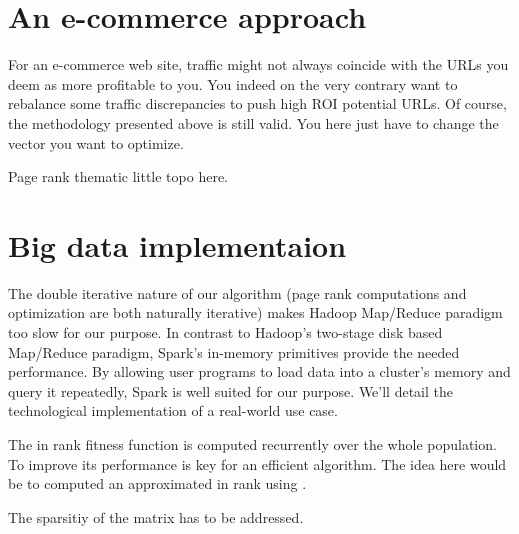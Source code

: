 \documentclass{iSWAGArticle}
\begin{document}
\section{An e-commerce approach}
For an e-commerce web site, traffic might not always coincide with the URLs you deem as more profitable to you.
You indeed on the very contrary want to rebalance some traffic discrepancies to push high ROI potential URLs.
Of course, the methodology presented above is still valid. You here just have to change the vector you want to
optimize.


Page rank thematic little topo here.

\section{Big data implementaion}
The double iterative nature of our algorithm (page rank computations and optimization are both naturally iterative)
makes Hadoop Map/Reduce paradigm too slow for our purpose. 
In contrast to Hadoop's two-stage disk based Map/Reduce paradigm, Spark's in-memory primitives provide the needed performance.
By allowing user programs to load data into a cluster's memory and query it repeatedly, Spark is well suited for our purpose.
We'll detail the technological implementation of a real-world use case.



The in rank fitness function is computed recurrently over the whole population. To improve its performance is key for an efficient
algorithm. The idea here would be to computed an approximated in rank using \cite{}.

The sparsitiy of the matrix has to be addressed.





\end{document}
